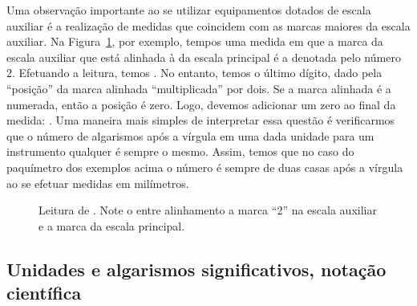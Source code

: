 Uma observação importante ao se utilizar equipamentos dotados de escala auxiliar é a realização de medidas que coincidem com as marcas maiores da escala auxiliar. Na Figura~\ref{Fig:PaquimetroLeituraZero}, por exemplo, tempos uma medida em que a marca da escala auxiliar que está alinhada à da escala principal é a denotada pelo número 2. Efetuando a leitura, temos . No entanto, temos o último dígito, dado pela ``posição'' da marca alinhada ``multiplicada'' por dois. Se a marca alinhada é a numerada, então a posição é zero. Logo, devemos adicionar um zero ao final da medida: . Uma maneira mais simples de interpretar essa questão é verificarmos que o número de algarismos após a vírgula em uma dada unidade para um instrumento qualquer é sempre o mesmo. Assim, temos que no caso do paquímetro dos exemplos acima o número é sempre de duas casas após a vírgula ao se efetuar medidas em milímetros.
\begin{figure}
\centering
{}
\caption{Leitura de . Note o entre alinhamento a  marca ``2'' na escala auxiliar e a marca da escala principal.\label{Fig:PaquimetroLeituraZero}}
\end{figure}

\subsection{Unidades e algarismos significativos, notação científica}
\label{Sec:UnidadesAlgSigNotacaoCientifica}

